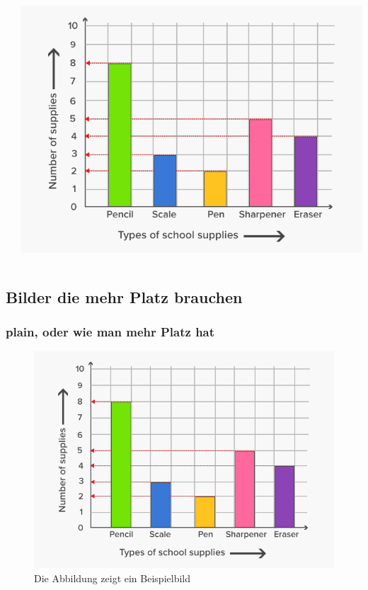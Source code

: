 \documentclass[compress,aspectratio=169]{beamer} %
\begin{document}
\begin{frame}
\begin{columns}
\begin{column}{3cm}
			\end{column}
			\begin{column}{3cm}
				\includegraphics[scale=0.15]{PIC1}
			\end{column}
		\end{columns}
	\end{frame}
	
	\subsection{Bilder die mehr Platz brauchen} 
	\begin{frame}[plain]
		\frametitle{plain, oder wie man mehr Platz hat}
		\begin{figure}
			\includegraphics[scale=0.3]{PIC1} 
			\caption{Die Abbildung zeigt ein Beispielbild}
		\end{figure}
	\end{frame}
	
	
\end{document}
